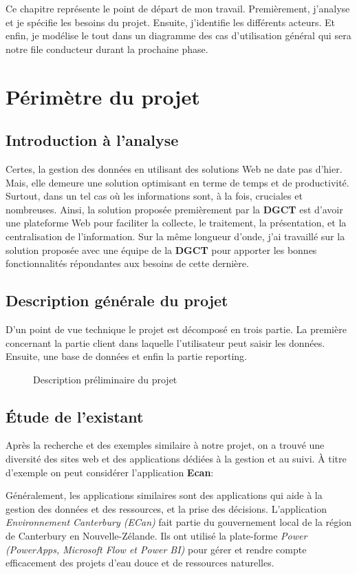 Ce chapitre représente le point de départ de mon travail. Premièrement,
j'analyse et
je spécifie les besoins du projet. Ensuite, j'identifie les différents
acteurs. Et enfin, je
modélise le tout dans un diagramme des cas d’utilisation général qui
sera notre file conducteur
durant la prochaine phase.
\section{Périmètre du projet}
\subsection{Introduction à l'analyse}
Certes, la gestion des données en utilisant des solutions
Web ne date pas d'hier. Mais,
elle demeure une solution optimisant en terme de temps et de
productivité. Surtout,
dans un tel cas où les informations sont, à la fois, cruciales et
nombreuses. Ainsi, la solution proposée premièrement par la \textbf{DGCT} est
d'avoir une plateforme Web pour faciliter la collecte,
le traitement, la présentation, et la centralisation de l'information.
Sur la même longueur d'onde, j'ai
travaillé sur la solution proposée avec une équipe de la \textbf{DGCT}
pour apporter les bonnes
fonctionnalités répondantes aux besoins de cette dernière.
\subsection{Description générale du projet}
D'un point de vue technique le projet est décomposé en trois partie. La
première concernant la partie client dans laquelle l'utilisateur peut saisir
les données. Ensuite, une base de données et enfin la partie reporting.
\begin{figure}[H]
    \begin{center}
        \caption{Description préliminaire du projet}
    \end{center}
\end{figure}
\subsection{Étude de l’existant}

Après la recherche et des exemples similaire à notre projet, on a
trouvé une diversité des sites web et des applications dédiées à la gestion et
au suivi.
À titre d'exemple on peut considérer l'application \textbf{\large Ecan}:

Généralement, les applications similaires sont des applications qui
aide à la gestion des données et des ressources, et la prise des décisions.
L’application \emph{Environnement Canterbury (ECan)} fait partie du
gouvernement local de la région de Canterbury en Nouvelle-Zélande. Ils ont
utilisé la plate-forme \emph{Power
    (PowerApps, Microsoft Flow et Power BI)} pour gérer et rendre compte
efficacement des projets d'eau douce et de ressources naturelles.

